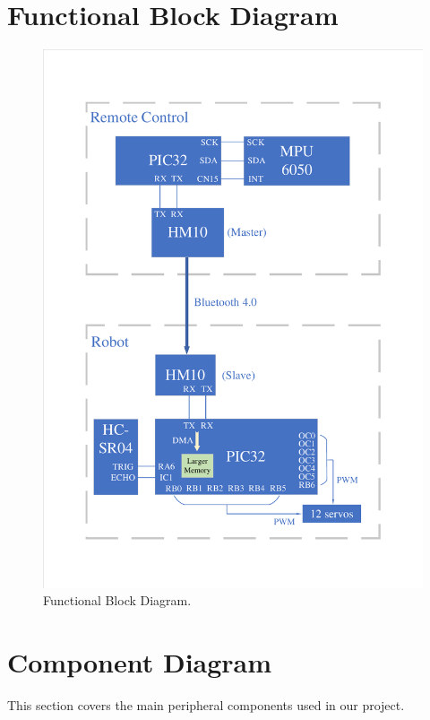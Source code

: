 \documentclass[a4paper]{article}
\begin{document}
\section{Functional Block Diagram}
\begin{figure}[H]
    \centering
    \includegraphics[width=1\textwidth]{Diagram.pdf}
    \caption{Functional Block Diagram.}
\end{figure}

\section{Component Diagram}
This section covers the main peripheral components used in our project.
\end{document}
